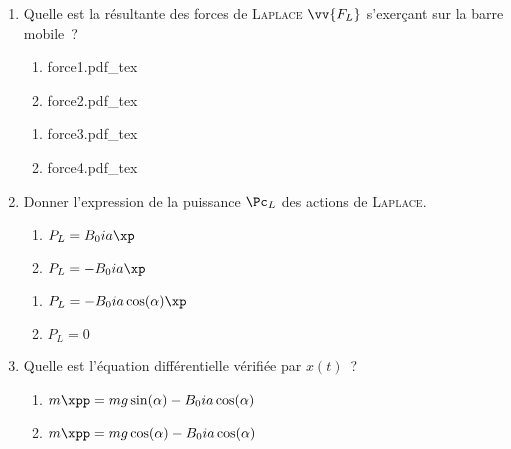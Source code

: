 \documentclass[11pt]{book}
\newcommand{\figsvg}[1]{
  \begin{center}
    {#1}
  \end{center}
}
\begin{document}
{	\begin{enumerate}
		\item Quelle est la résultante des forces de \textsc{Laplace} $\vv{F_L}$
		      s'exerçant sur la barre mobile~?
		      \smallbreak
		      \noindent
		      \begin{minipage}{0.5\linewidth}
			      \begin{enumerate}
				      \item \figsvg{force1.pdf_tex}
				      \item \figsvg{force2.pdf_tex}
			      \end{enumerate}
		      \end{minipage}
		      \begin{minipage}{0.5\linewidth}
			      \begin{enumerate}[start=3]
				      \item \figsvg{force3.pdf_tex}
				      \item \figsvg{force4.pdf_tex}
			      \end{enumerate}
		      \end{minipage}
		\item Donner l'expression de la puissance $\Pc_L$ des actions de
		      \textsc{Laplace}.
		      \smallbreak
		      \noindent
		      \begin{minipage}{0.5\linewidth}
			      \begin{enumerate}
				      \item $P_L=B_0ia \xp$
				      \item $P_L=-B_0ia\xp$
			      \end{enumerate}
		      \end{minipage}
		      \begin{minipage}{0.5\linewidth}
			      \begin{enumerate}[start=3]
				      \item $P_L=-B_0ia\cos(\alpha)\xp$
				      \item $P_L=0$
			      \end{enumerate}
		      \end{minipage}
		\item Quelle est l'équation différentielle vérifiée par $x(t)$~?
		      \smallbreak
		      \noindent
		      \begin{minipage}{0.5\linewidth}
			      \begin{enumerate}
				      \item $m\xpp=mg\sin(\alpha)-B_0ia\cos(\alpha)$
				      \item $m\xpp=mg\cos(\alpha)-B_0ia\cos(\alpha)$

\end{enumerate}
\end{minipage}
\end{enumerate}}
\end{document}
